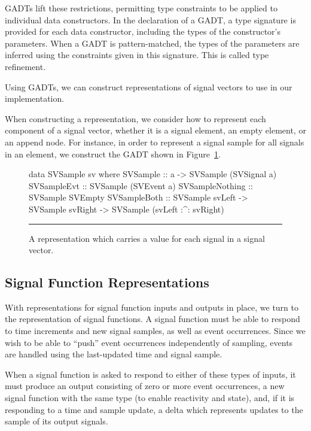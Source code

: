 \documentclass[draft]{llncs}
\begin{document}
GADTs lift these restrictions, permitting type constraints to be applied
to individual data constructors. In the declaration of a GADT, a type signature
is provided for each data constructor, including the types of the constructor's
parameters. When a GADT is pattern-matched, the types of the parameters are
inferred using the constraints given in this signature. This is called type
refinement.

Using GADTs, we can construct representations of signal vectors to use in our
implementation. 

When constructing a representation, we consider how to represent each
component of a signal vector, whether it is a signal element, an empty
element, or an append node. For instance, in order to represent a signal
sample for all signals in an element, we construct the GADT shown in Figure~\ref{figure:signal_sample_representation}.

\begin{figure}
\begin{code}
data SVSample sv where
  SVSample        ::    a -> SVSample (SVSignal a)
  SVSampleEvt     ::    SVSample (SVEvent a)
  SVSampleNothing ::    SVSample SVEmpty
  SVSampleBoth    ::    SVSample svLeft
                     -> SVSample svRight
                     -> SVSample (svLeft :^: svRight)
\end{code}
\hrule
\caption{A representation which carries a value for each signal in a signal vector.}
\label{figure:signal_sample_representation}
\end{figure}

\subsection{Signal Function Representations}
\label{subsection:Signal_Function_Representations}
With representations for signal function inputs and outputs in place, we turn
to the representation of signal functions. A signal function must be able to
respond to time increments and new signal samples, as well as event occurrences.
Since we wish to be able to ``push'' event occurrences independently of
sampling, events are handled using the last-updated time and signal sample.

When a signal function is asked to respond to either of these types of inputs,
it must produce an output consisting of zero or more event occurrences, a new
signal function with the same type (to enable reactivity and state), and, if
it is responding to a time and sample update, a delta which represents updates
to the sample of its output signals.
\end{document}
